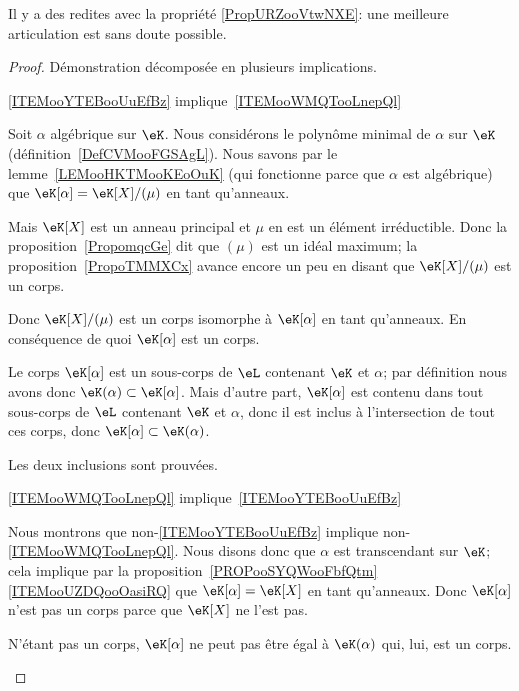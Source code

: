 \begin{probleme}
Il y a des redites avec la propriété \ref{PropURZooVtwNXE}: une meilleure articulation est sans doute possible.
\end{probleme}

\begin{proof}
    Démonstration décomposée en plusieurs implications.
    \begin{subproof}
        \item[\ref{ITEMooYTEBooUuEfBz} implique~\ref{ITEMooWMQTooLnepQl}]

            Soit \( \alpha\) algébrique sur \( \eK\). Nous considérons le polynôme minimal de \( \alpha\) sur \( \eK\) (définition~\ref{DefCVMooFGSAgL}). Nous savons par le lemme~\ref{LEMooHKTMooKEoOuK} (qui fonctionne parce que \( \alpha\) est algébrique) que \( \eK[\alpha]=\eK[X]/(\mu)\) en tant qu'anneaux.

            Mais \( \eK[X]\) est un anneau principal et \( \mu\) en est un élément irréductible. Donc la proposition~\ref{PropomqcGe} dit que \( (\mu)\) est un idéal maximum; la proposition~\ref{PropoTMMXCx} avance encore un peu en disant que \( \eK[X]/(\mu)\) est un corps.

            Donc \( \eK[X]/(\mu)\) est un corps isomorphe à \( \eK[\alpha]\) en tant qu'anneaux. En conséquence de quoi \( \eK[\alpha]\) est un corps.

            Le corps \( \eK[\alpha]\) est un sous-corps de \( \eL\) contenant \( \eK\) et \( \alpha\); par définition nous avons donc \( \eK(\alpha)\subset \eK[\alpha]\). Mais d'autre part, \( \eK[\alpha]\) est contenu dans tout sous-corps de \( \eL\) contenant \( \eK\) et \( \alpha\), donc il est inclus à l'intersection de tout ces corps, donc \( \eK[\alpha]\subset \eK(\alpha)\).

            Les deux inclusions sont prouvées.

        \item[\ref{ITEMooWMQTooLnepQl} implique~\ref{ITEMooYTEBooUuEfBz}]

            Nous montrons que non-\ref{ITEMooYTEBooUuEfBz} implique non-\ref{ITEMooWMQTooLnepQl}. Nous disons donc que \( \alpha\) est transcendant sur \( \eK\); cela implique par la proposition~\ref{PROPooSYQWooFbfQtm}\ref{ITEMooUZDQooOasiRQ} que \( \eK[\alpha]=\eK[X]\) en tant qu'anneaux. Donc \( \eK[\alpha]\) n'est pas un corps parce que \( \eK[X]\) ne l'est pas.

            N'étant pas un corps, \( \eK[\alpha]\) ne peut pas être égal à \( \eK(\alpha)\) qui, lui, est un corps.


\end{subproof}
\end{proof}
